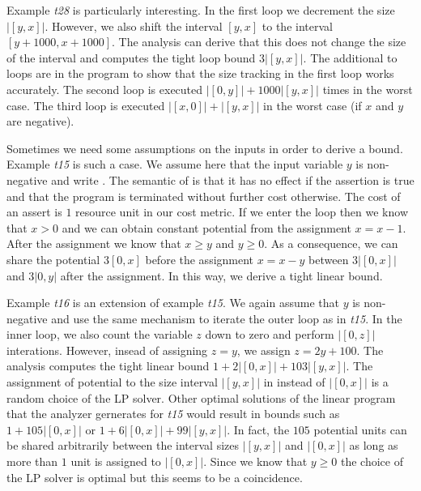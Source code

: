 \documentclass[nocopyrightspace,preprint]{sigplanconf}
\begin{document}
Example \emph{t28} is particularly interesting.  In the first loop we
decrement the size $|[y,x]|$.  However, we also shift the interval
$[y,x]$ to the interval $[y+1000,x+1000]$.  The analysis can derive
that this does not change the size of the interval and computes the
tight loop bound $3|[y,x]|$.  The additional to loops are in the
program to show that the size tracking in the first loop works
accurately.  The second loop is executed $|[0,y]| + 1000|[y,x]|$ times
in the worst case.  The third loop is executed $|[x,0]| + |[y,x]|$ in
the worst case (if $x$ and $y$ are negative).

Sometimes we need some assumptions on the inputs in order to derive a
bound.  Example \emph{t15} is such a case.  We assume here that the
input variable $y$ is non-negative and write .  The
semantic of  is that it has no effect if the assertion is
true and that the program is terminated without further cost
otherwise.  The cost of an assert is $1$ resource unit in our cost
metric.  If we enter the loop then we know that $x>0$ and we can
obtain constant potential from the assignment $x=x-1$.  After the
assignment we know that $x\geq y$ and $y\geq 0$.  As a consequence, we
can share the potential $3[0,x]$ before the assignment $x=x-y$ between
$3|[0,x]|$ and $3|0,y|$ after the assignment.  In this way, we derive
a tight linear bound.

Example \emph{t16} is an extension of example \emph{t15}. We again
assume that $y$ is non-negative and use the same mechanism to iterate
the outer loop as in \emph{t15}.  In the inner loop, we also count the
variable $z$ down to zero and perform $|[0,z]|$ interations.  However,
insead of assigning $z=y$, we assign $z=2y+100$.  The analysis
computes the tight linear bound $1+2|[0,x]|+103|[y,x]|$.  The
assignment of potential to the size interval $|[y,x]|$ in instead of
$|[0,x]|$ is a random choice of the LP solver.  Other optimal
solutions of the linear program that the analyzer gernerates for
\emph{t15} would result in bounds such as $1+105|[0,x]|$ or
$1+6|[0,x]|+99|[y,x]|$.  In fact, the $105$ potential units can be
shared arbitrarily between the interval sizes $|[y,x]|$ and $|[0,x]|$
as long as more than $1$ unit is assigned to $|[0,x]|$.  Since we know
that $y\geq 0$ the choice of the LP solver is optimal but this seems
to be a coincidence.








\end{document}

